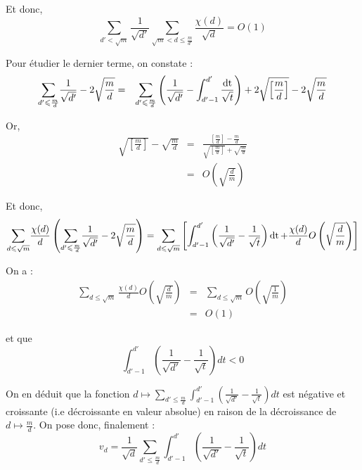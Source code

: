 Et donc,
\[ \underset{d' < \sqrt{m}}{\sum} \frac{1}{\sqrt{d'}} \underset{\sqrt{m} < d
   \leqslant \frac{m}{d'}}{\sum} \frac{\chi (d)}{\sqrt{d}} = O (1) \]


Pour {\'e}tudier le dernier terme, on constate :
\begin{eqnarray*}
  \underset{d' \leqslant \frac{m}{d}}{\sum} \frac{1}{\sqrt{d'}} - 2
  \sqrt{\frac{m}{d}} & = & \underset{d' \leqslant \frac{m}{d}}{\sum} \left(
  \frac{1}{\sqrt{d'}} - \int^{d'}_{d' - 1} \frac{\operatorname{dt}}{\sqrt{t}} \right)
  + 2 \sqrt{\left[ \frac{m}{d} \right]} - 2 \sqrt{\frac{m}{d}}
\end{eqnarray*}


Or,
\begin{eqnarray*}
  \sqrt{\left[ \frac{m}{d} \right]} - \sqrt{\frac{m}{d}} & = & \frac{\left[
  \frac{m}{d} \right] - \frac{m}{d}}{\sqrt{\left[ \frac{m}{d} \right]} +
  \sqrt{\frac{m}{d}}}\\
  & = & O \left( \sqrt{\frac{d}{m}} \right)
\end{eqnarray*}


Et donc,
\[ \underset{d \leqslant \sqrt{m}}{\sum} \frac{\chi (d)}{d} \left(
   \underset{d' \leqslant \frac{m}{d}}{\sum} \frac{1}{\sqrt{d'}} - 2
   \sqrt{\frac{m}{d}} \right) = \underset{d \leqslant \sqrt{m}}{\sum} \left[
   \int^{d'}_{d' - 1} \left( \frac{1}{\sqrt{d'}} - \frac{1}{\sqrt{t}} \right)
   \operatorname{dt} + \frac{\chi (d)}{d} O \left( \sqrt{\frac{d}{m}} \right) \right]
\]


On a :
\begin{eqnarray*}
  \underset{d \leqslant \sqrt{m}}{\sum} \frac{\chi (d)}{d} O \left(
  \sqrt{\frac{d}{m}} \right) & = & \underset{d \leqslant \sqrt{m}}{\sum} O
  \left( \sqrt{\frac{1}{m}} \right)\\
  & = & O (1)
\end{eqnarray*}


et que
\[ \int^{d'}_{d' - 1} \left( \frac{1}{\sqrt{d'}} - \frac{1}{\sqrt{t}} \right)
   d t < 0 \]


On en d{\'e}duit que la fonction  $d \longmapsto \underset{d' \leqslant
\frac{m}{d}}{\sum} \int^{d'}_{d' - 1} \left( \frac{1}{\sqrt{d'}} -
\frac{1}{\sqrt{t}} \right) d t$ est n{\'e}gative et croissante (i.e
d{\'e}croissante en valeur absolue) en raison de la d{\'e}croissance de $d
\longmapsto \frac{m}{d}$. On pose donc, finalement :
\[ v_d = \frac{1}{\sqrt{d}} \underset{d' \leqslant \frac{m}{d}}{\sum}
   \int^{d'}_{d' - 1} \left( \frac{1}{\sqrt{d'}} - \frac{1}{\sqrt{t}} \right)
   d t \]



